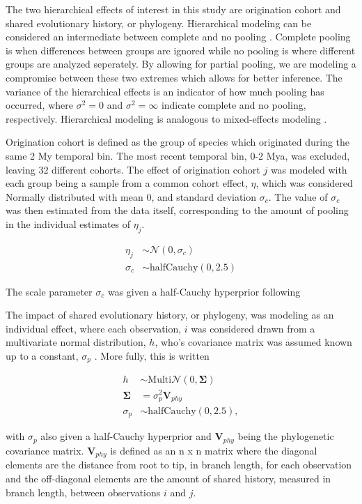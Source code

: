 \documentclass[12pt,letterpaper]{article}
\begin{document}
The two hierarchical effects of interest in this study are origination cohort and shared evolutionary history, or phylogeny. Hierarchical modeling can be considered an intermediate between complete and no pooling \citep{Gelman2007}. Complete pooling is when differences between groups are ignored while no pooling is where different groups are analyzed seperately. By allowing for partial pooling, we are modeling a compromise between these two extremes which allows for better inference. The variance of the hierarchical effects is an indicator of how much pooling has occurred, where \(\sigma^{2} = 0\) and \(\sigma^{2} = \infty\) indicate complete and no pooling, respectively. Hierarchical modeling is analogous to mixed-effects modeling \citep{Gelman2007}. 

Origination cohort is defined as the group of species which originated during the same 2 My temporal bin. The most recent temporal bin, 0-2 Mya, was excluded, leaving 32 different cohorts. The effect of origination cohort \(j\) was modeled with each group being a sample from a common cohort effect, \(\eta\), which was considered Normally distributed with mean 0, and standard deviation \(\sigma_{c}\). The value of \(\sigma_{c}\) was then estimated from the data itself, corresponding to the amount of pooling in the individual estimates of \(\eta_{j}\).

\begin{align*}
  \eta_{j} &\sim \mathcal{N}(0, \sigma_{c}) \\
  \sigma_{c} &\sim \mathrm{halfCauchy}(0, 2.5)
\end{align*}

The scale parameter \(\sigma_{c}\) was given a half-Cauchy hyperprior following \citet{Gelman2006a}

The impact of shared evolutionary history, or phylogeny, was modeling as an individual effect, where each observation, \(i\) was considered drawn from a multivariate normal distribution, \(h\), who's covariance matrix was assumed known up to a constant, \(\sigma_{p}\) \citep{Lynch1991,Housworth2004}. More fully, this is written

\begin{align*}
  h &\sim \mathrm{Multi}\mathcal{N}(0, \mathbf{\Sigma}) \\
  \mathbf{\Sigma} &= \sigma_{p}^{2} \mathbf{V}_{phy} \\
  \sigma_{p} &\sim \mathrm{halfCauchy}(0, 2.5),
\end{align*}
 
with \(\sigma_{p}\) also given a half-Cauchy hyperprior and \(\mathbf{V}_{phy}\) being the phylogenetic covariance matrix. \(\mathbf{V}_{phy}\) is defined as an n x n matrix where the diagonal elements are the distance from root to tip, in branch length, for each observation and the off-diagonal elements are the amount of shared history, measured in branch length, between observations \(i\) and \(j\).
\end{document}
